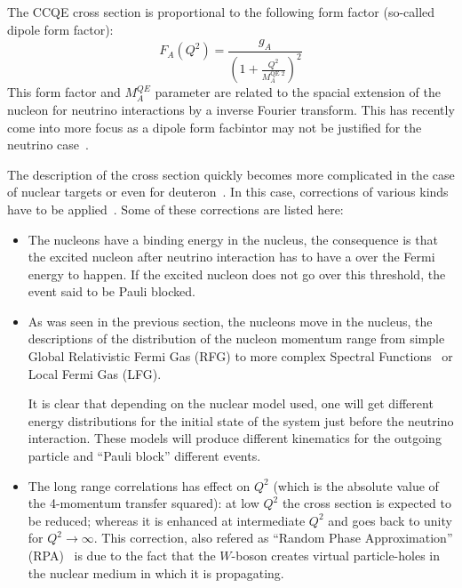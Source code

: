 The \Gls{CCQE} cross section is proportional to the following form
factor (so-called dipole form factor):
\begin{equation}
  \label{eq:ccqeff}
  F_A(Q^2) = \frac{g_A}{\left(1+\frac{Q^2}{M_A^{\text{QE~}2}}\right)^2}
\end{equation}
This form factor and $M_A^{QE}$ parameter are related to the spacial
extension of the nucleon for neutrino interactions by a inverse
Fourier transform. This has recently come into more focus as a dipole
form facbintor may not be justified for the neutrino
case~\cite{PhysRevD.93.113015,PhysRevD.92.113011}.

The description of the cross section quickly becomes more complicated
in the case of nuclear targets or even for
deuteron~\cite{SinghDeuteron}. In this case, corrections of various
kinds have to be applied~\cite{SmithMoniz,NievesCCinc}. Some of these
corrections are listed here:

\begin{itemize}
\item The nucleons have a binding energy in the nucleus, the
  consequence is that the excited nucleon after neutrino interaction
  has to have a over the Fermi energy to happen. If the excited
  nucleon does not go over this threshold, the event said to be Pauli
  blocked.
\item As was seen in the previous section, the nucleons move in the
  nucleus, the descriptions of the distribution of the nucleon
  momentum range from simple Global Relativistic Fermi Gas (\Gls{RFG})
  to more complex Spectral Functions~\cite{Benhar} or Local Fermi Gas
  (\Gls{LFG}).

  It is clear that depending on the nuclear model used, one will get
  different energy distributions for the initial state of the system
  just before the neutrino interaction. These models will produce
  different kinematics for the outgoing particle and ``Pauli block''
  different events.
\item The long range correlations has effect on $Q^2$ (which is the
  absolute value of the 4-momentum transfer squared): at low $Q^2$ the
  cross section is expected to be reduced; whereas it is enhanced at
  intermediate $Q^2$ and goes back to unity for
  $Q^2\rightarrow \infty $.  This correction, also refered as ``Random
  Phase Approximation'' (\Gls{RPA})~\cite{NievesCCinc} is due to the
  fact that the $W$-boson creates virtual particle-holes in the
  nuclear medium in which it is propagating.
\end{itemize}

